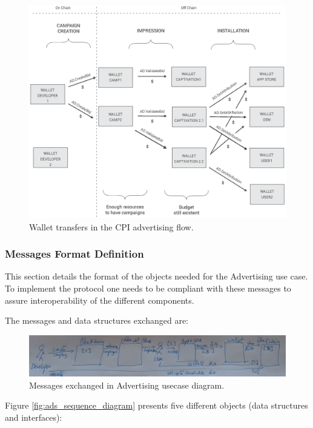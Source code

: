 \begin{figure}[H]
\centering
\includegraphics[width=\textwidth]{diagrams/wallet_transfers.eps}
\caption{Wallet transfers in the CPI advertising flow.}
\label{fig:wallet_cpi_flow}
\end{figure}

\subsubsection{Messages Format Definition}
\label{sssec:ads_fd}

This section details the format of the objects needed for the Advertising use case. To implement the protocol one needs to be compliant with these messages to assure interoperability of the different components.

The messages and data structures exchanged are:

\begin{figure}[H]
\centering
\includegraphics[width=\textwidth]{diagrams/messages_exchanged_diagram.png}
\caption{Messages exchanged in Advertising usecase diagram.}
\label{fig:messages_diagram}
\end{figure}


Figure \ref{fig:ads_sequence_diagram} presents five different objects (data structures and interfaces):

